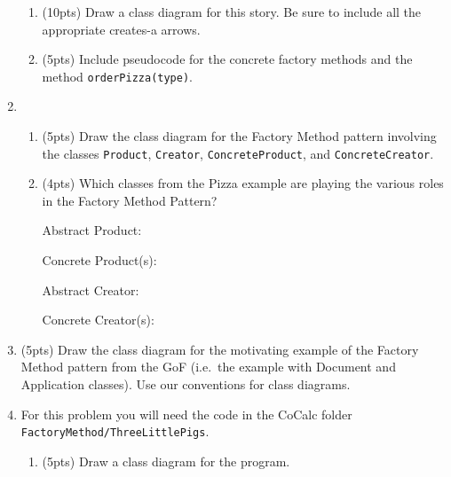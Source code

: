 \documentclass[11pt]{article}
\begin{document}
\begin{enumerate}
\begin{itemize}
  \end{itemize}

  \begin{enumerate}

    \item (10pts) Draw a class diagram for this story. Be sure to include all the appropriate creates-a arrows.

    \item (5pts) Include pseudocode for the concrete factory methods and the method \texttt{orderPizza(type)}.

  \end{enumerate}

\newpage

  \item 

  \begin{enumerate} 

    \item (5pts) Draw the class diagram for the Factory Method pattern involving the classes \texttt{Product}, \texttt{Creator}, \texttt{ConcreteProduct}, and \texttt{ConcreteCreator}.

    \vfill

    \item (4pts) Which classes from the Pizza example are playing the various roles in the Factory Method Pattern?
    \medskip 

    Abstract Product:
    \medskip 

    Concrete Product(s):
    \medskip

    Abstract Creator:
    \medskip

    Concrete Creator(s):
    \medskip

  \end{enumerate}

  \item (5pts) Draw the class diagram for the motivating example of the Factory Method pattern from the GoF (i.e.~the example with Document and Application classes). Use our conventions for class diagrams.

  \vfill

\newpage

  \item For this problem you will need the code in the CoCalc folder \texttt{FactoryMethod/ThreeLittlePigs}. 

  \begin{enumerate}

    \item (5pts) Draw a class diagram for the program.


\end{enumerate}
\end{enumerate}
\end{document}
